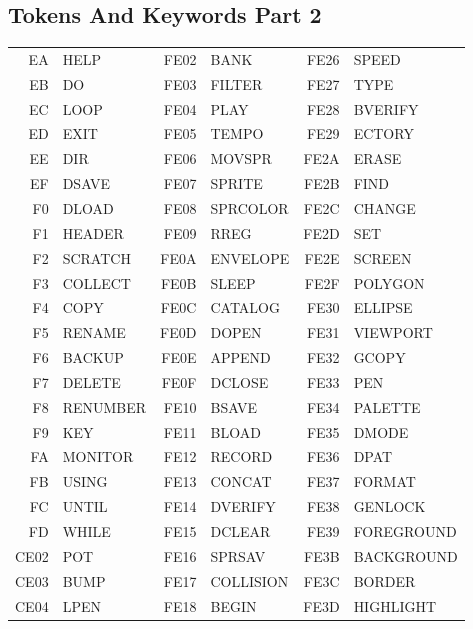 \subsection{Tokens And Keywords Part 2}
{\ttfamily
\setlength{\tabcolsep}{1mm}
\begin{tabular}{|rp{2.2cm}|rp{2.2cm}|rp{2.2cm}|}
\hline
  EA & HELP       &FE02 & BANK       &FE26 & SPEED      \\
  EB & DO         &FE03 & FILTER     &FE27 & TYPE       \\
  EC & LOOP       &FE04 & PLAY       &FE28 & BVERIFY    \\
  ED & EXIT       &FE05 & TEMPO      &FE29 & ECTORY     \\
  EE & DIR        &FE06 & MOVSPR     &FE2A & ERASE      \\
  EF & DSAVE      &FE07 & SPRITE     &FE2B & FIND       \\
  F0 & DLOAD      &FE08 & SPRCOLOR   &FE2C & CHANGE     \\
  F1 & HEADER     &FE09 & RREG       &FE2D & SET        \\
  F2 & SCRATCH    &FE0A & ENVELOPE   &FE2E & SCREEN     \\
  F3 & COLLECT    &FE0B & SLEEP      &FE2F & POLYGON    \\
  F4 & COPY       &FE0C & CATALOG    &FE30 & ELLIPSE    \\
  F5 & RENAME     &FE0D & DOPEN      &FE31 & VIEWPORT   \\
  F6 & BACKUP     &FE0E & APPEND     &FE32 & GCOPY      \\
  F7 & DELETE     &FE0F & DCLOSE     &FE33 & PEN        \\
  F8 & RENUMBER   &FE10 & BSAVE      &FE34 & PALETTE    \\
  F9 & KEY        &FE11 & BLOAD      &FE35 & DMODE      \\
  FA & MONITOR    &FE12 & RECORD     &FE36 & DPAT       \\
  FB & USING      &FE13 & CONCAT     &FE37 & FORMAT     \\
  FC & UNTIL      &FE14 & DVERIFY    &FE38 & GENLOCK    \\
  FD & WHILE      &FE15 & DCLEAR     &FE39 & FOREGROUND \\
CE02 & POT        &FE16 & SPRSAV     &FE3B & BACKGROUND \\
CE03 & BUMP       &FE17 & COLLISION  &FE3C & BORDER     \\
CE04 & LPEN       &FE18 & BEGIN      &FE3D & HIGHLIGHT  \\

\end{tabular}}
